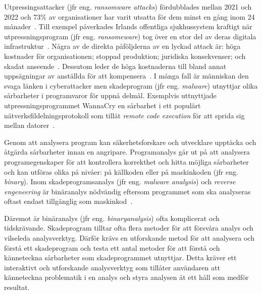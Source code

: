 Utpressingsattacker (jfr eng. \emph{ransomware attacks}) fördubblades
mellan 2021 och 2022 och 73\% av organisationer har varit utsatta för dem
minst en gång inom 24 månader~\cite{cyberreason2021,
    cyberreason2022}. Till exempel påverkades Irlands offentliga sjukhussystem
kraftigt när utpressningsprogram (jfr eng. \emph{ransomeware}) tog över en stor del av deras digitala
infrastruktur~\cite{hse_report, gallagher2023}. Några av de direkta påföljderna
av en lyckad attack är: höga kostnader för organisationen; stoppad
produktion; juridiska konsekvenser; och skadat
anseende~\cite{cyberreason2021, cyberreason2022}. Dessutom leder de höga
kostnaderna till bland annat uppsägningar av anställda för att
kompensera~\cite{cyberreason2021, cyberreason2022}. I många fall är människan
den svaga länken i cyberattacker men skadeprogram (jfr eng.
\emph{malware}) utnyttjar olika sårbarheter i programvaror för uppnå delmål.
Exemplvis uttnyttjade utpressningsprogrammet WannaCry en
sårbarhet i ett populärt nätverksfildelningsprotokoll som tillät \emph{remote
    code execution} för att sprida sig mellan
datorer~\cite{alraddadicomprehensive}.

Genom att analysera program kan säkerhetsforskare och utvecklare upptäcka och
åtgärda sårbarheter innan en angripare. Programanalys går ut på att analysera
programegenskaper för att kontrollera korrekthet och hitta möjliga sårbarheter
och kan utföras olika på nivåer: på källkoden eller på maskinkoden (jfr eng.
\emph{binary}). Inom skadeprogramsanalys (jfr eng. \emph{malware analysis}) och
\emph{reverse engeneering} är binäranalys nödvändig eftersom programmet som ska
analyseras oftast endast tillgänglig som maskinkod~\cite{andriesse2018}.


Däremot är binäranalys (jfr eng. \emph{binaryanalysis}) ofta komplicerat och
tidskrävande. Skadeprogram tilltar ofta flera metoder för att försvåra
analys och vilseleda analysverktyg. Därför krävs en utforskande metod för att
analysera och förstå ett skadeprogram och testa ett antal metoder för att förstå
och känneteckna sårbarheter som skadeprogrammet utnyttjar. Detta kräver ett
interaktivt och utforskande analysverktyg som tillåter användaren att
känneteckna problematik i en analys och styra analysen åt ett håll som medför
resultat.

